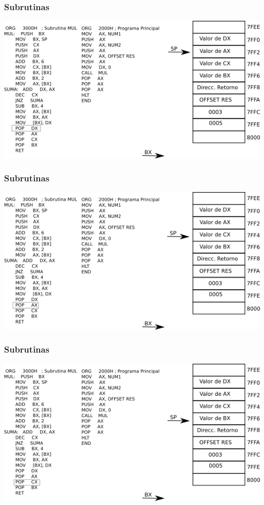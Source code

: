 \documentclass{beamer}
\begin{document}
\begin{frame}
\frametitle{Subrutinas}
\includegraphics[scale=0.70]{imgs/imagen_014.png}
\end{frame}

\begin{frame}
\frametitle{Subrutinas}
\includegraphics[scale=0.70]{imgs/imagen_015.png}
\end{frame}

\begin{frame}
\frametitle{Subrutinas}
\includegraphics[scale=0.70]{imgs/imagen_016.png}
\end{frame}
\end{document}
